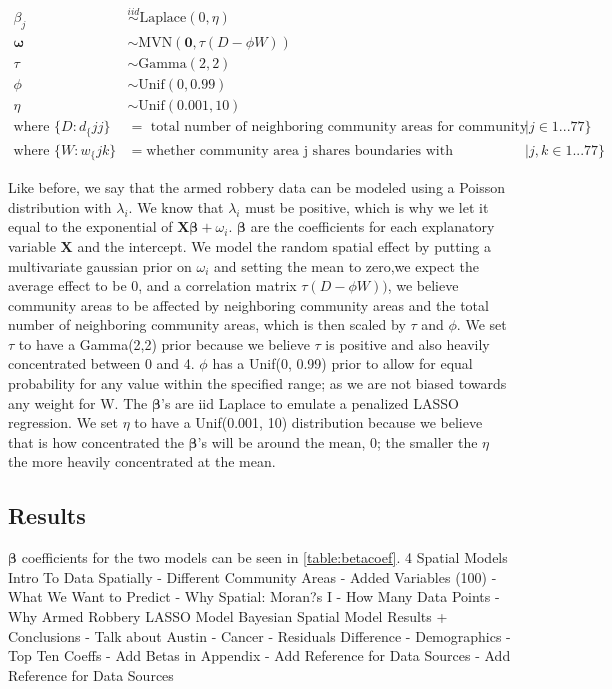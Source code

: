 \documentclass{article} %
\begin{document}
$$
\begin{aligned}
\beta_j &\overset{iid}{\sim} \text{Laplace}(0, \eta)\\
\boldsymbol{\omega} &\sim \text{MVN}(\mathbf{0}, \tau(D -\phi W))\\
\tau &\sim \text{Gamma}(2,2)\\
\phi &\sim \text{Unif}(0,0.99)\\
\eta &\sim \text{Unif}(0.001,10)\\
\text{where } \{D:d_\{jj\} &= \text{ total number of neighboring community areas for community area j}| j \in 1...77\} \\  
\text{where } \{W:w_\{jk\} &= \text{whether community area j shares boundaries with community area k}| j,k \in 1...77\}
\end{aligned}
$$

Like before, we say that the armed robbery data can be modeled using a Poisson distribution with $\lambda_i$. We know that $\lambda_i$ must be positive, which is why we let it equal to the exponential of $\mathbf{X}\boldsymbol{\beta} + \omega_i$. $\boldsymbol{\beta}$ are the coefficients for each explanatory variable $\mathbf{X}$ and the intercept. We model the random spatial effect by putting a multivariate gaussian prior on $\omega_i$ and setting the mean to zero,we expect the average effect to be 0, and a correlation matrix $\tau(D -\phi W))$, we believe community areas to be affected by neighboring community areas and the total number of neighboring community areas, which is then scaled by $\tau$ and $\phi$. We set $\tau$ to have a Gamma(2,2) prior because we believe $\tau$ is positive and also heavily concentrated between 0 and 4. $\phi$ has a Unif(0, 0.99) prior to allow for equal probability for any value within the specified range; as we are not biased towards any weight for W. The $\boldsymbol{\beta}$’s are iid Laplace to emulate a penalized LASSO regression. We set $\eta$ to have a Unif(0.001, 10) distribution because we believe that is how concentrated the $\boldsymbol{\beta}$'s will be around the mean, 0; the smaller the $\eta$ the more heavily concentrated at the mean. 



\subsection{Results}

$\boldsymbol{\beta}$ coefficients for the two models can be seen in \autoref{table:betacoef}. 
4 Spatial Models
Intro To Data Spatially - Different Community Areas - Added Variables (100) - What We Want to
Predict - Why Spatial: Moran?s I - How Many Data Points - Why Armed Robbery
LASSO Model
Bayesian Spatial Model
Results + Conclusions - Talk about Austin - Cancer - Residuals Difference - Demographics - Top
Ten Coeffs
- Add Betas in Appendix - Add Reference for Data Sources
- Add Reference for Data Sources 
\end{document}
